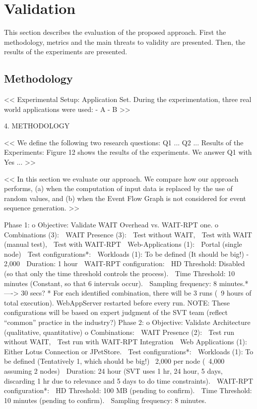 \documentclass[runningheads,a4paper]{llncs}
\begin{document}

\section{Validation}

This section describes the evaluation of the proposed approach. First the
methodology, metrics and the main threats to validity are
presented. Then, the results of the experiments are presented.

\subsection{Methodology}

<<
Experimental Setup: Application Set. During the experimentation, three real world applications
were used:
- A
- B
>>

4.	METHODOLOGY

<<
We define the following two research questions: Q1 ... Q2 ...
Results of the Experiments: Figure 12 shows the results of the experiments. We answer Q1 with Yes ...
>>

<<
In this section we evaluate our approach. We compare how our approach performs,
(a) when the computation of input data is replaced by the use of random
values, and (b) when the Event Flow Graph is not considered for event sequence
generation.
>>

Phase 1:
o	Objective: Validate WAIT Overhead vs. WAIT-RPT one.
o	Combinations (3):
	WAIT Presence (3): 
	Test without WAIT, 
	Test with WAIT (manual test), 
	Test with WAIT-RPT
	Web-Applications (1): 
	Portal (single node)
	Test configurations*:
	Workloads (1): To be defined (It should be big!) - 2,000
	Duration: 1 hour
	WAIT-RPT configuration:
	HD Threshold: Disabled (so that only the time threshold controls the process).
	Time Threshold: 10 minutes (Constant, so that 6 intervals occur).
	Sampling frequency: 8 minutes.* ----> 30 secs?
* For each identified combination, there will be 3 runs (~9 hours of total execution). WebAppServer restarted before every run.
NOTE: These configurations will be based on expert judgment of the SVT team (reflect “common” practice in the industry?)
Phase 2: 
o	Objective: Validate Architecture (qualitative, quantitative)
o	Combinations:
	WAIT Presence (2):
	Test run without WAIT,
	Test run with WAIT-RPT Integration
	Web Applications (1):
	Either Lotus Connection or JPetStore.
	Test configurations*:
	Workloads (1): To be defined (Tentatively 1, which should be big!) ~2,000 per node (~4,000 assuming 2 nodes)
	Duration: 24 hour (SVT uses 1 hr, 24 hour, 5 days, discarding 1 hr due to relevance and 5 days to do time constraints).
	WAIT-RPT configuration*:
	HD Threshold: 100 MB (pending to confirm).
	Time Threshold: 10 minutes (pending to confirm).
	Sampling frequency: 8 minutes.
\end{document}
